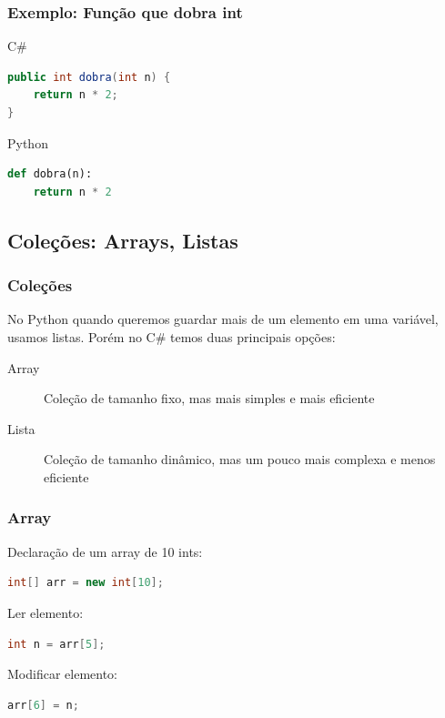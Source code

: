 \documentclass{beamer}
\begin{document}
	\begin{frame}[fragile]
		\frametitle{Exemplo: Função que dobra int}
			\begin{block}{C\#}
				\begin{lstlisting}[language=Java,basicstyle=\ttfamily,keywordstyle=\color{blue}]
public int dobra(int n) {
	return n * 2;
}
				\end{lstlisting}
			\end{block}

			\begin{block}{Python}
				\begin{lstlisting}[language=Python,basicstyle=\ttfamily,keywordstyle=\color{blue}]
def dobra(n):
	return n * 2
				\end{lstlisting}
			\end{block}
	\end{frame}

	\subsection{Coleções: Arrays, Listas}
	\begin{frame}
		\frametitle{Coleções}

		No Python quando queremos guardar mais de um elemento em uma variável,
		usamos listas. Porém no C\# temos duas principais opções:

		\begin{description}
			\item[Array] Coleção de tamanho fixo, mas mais simples e mais eficiente
			\item[Lista] Coleção de tamanho dinâmico, mas um pouco mais complexa e menos eficiente
		\end{description}

	\end{frame}

	\begin{frame}[fragile]
		\frametitle{Array}

		Declaração de um array de 10 ints:
		\begin{lstlisting}[language=Java,basicstyle=\ttfamily,keywordstyle=\color{blue}]
int[] arr = new int[10];
		\end{lstlisting}

		Ler elemento:
		\begin{lstlisting}[language=Java,basicstyle=\ttfamily,keywordstyle=\color{blue}]
int n = arr[5];
		\end{lstlisting}

		Modificar elemento:
		\begin{lstlisting}[language=Java,basicstyle=\ttfamily,keywordstyle=\color{blue}]
arr[6] = n;
		\end{lstlisting}

	\end{frame}
\end{document}
